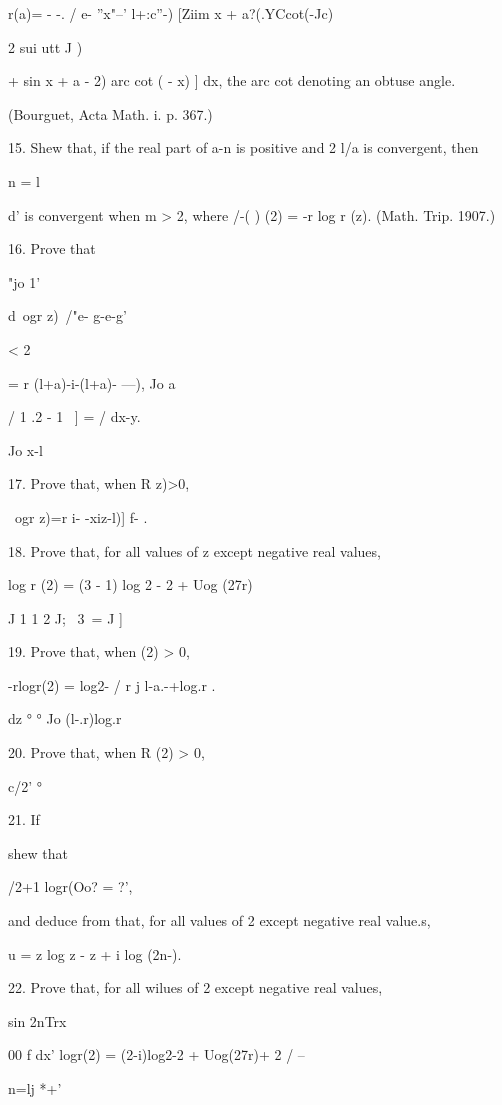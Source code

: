 r(a)= - -. / e- ''x"--' l+:c''-) [Ziim x + a?(.YCcot(-Jc)

2 sui utt J )

+ sin x + a - 2) arc cot ( - x) ] dx, the arc cot denoting an obtuse
angle.

(Bourguet, Acta Math. i. p. 367.)

15. Shew that, if the real part of a-n is positive and 2 l/a is
convergent, then

n = l

d' is convergent when m > 2, where \//-( ) (2) = -r log r (z). (Math.
Trip. 1907.)

16. Prove that

"jo 1'

d\ ogr z)\ /"e- g-e-g'

< 2

= r (l+a)-i-(l+a)- ---), Jo a

/ 1 .2 - 1 \ ] = / dx-y. 

Jo x-l

%
%

17. Prove that, when R z)>0,

\ ogr z)=r i- -xiz-l)] f- . 

18. Prove that, for all values of z except negative real values,

log r (2) = (3 - 1) log 2 - 2 + Uog (27r)

J 1 1 2 J; \ 3\ = J ]

19. Prove that, when (2) > 0,

-rlogr(2) = log2- / r j l-a.-+log.r .

dz ° ° Jo (l-.r)log.r

20. Prove that, when R (2) > 0,

c/2' °

21. If

shew that

/2+1 logr(Oo? = ?',

and deduce from  that, for all values of 2 except negative real
value.s,

u = z log z - z + i log (2n-).


22. Prove that, for all wilues of 2 except negative real values,

sin 2nTrx

00 f dx' logr(2) = (2-i)log2-2 + Uog(27r)+ 2 / --

n=lj *+'

